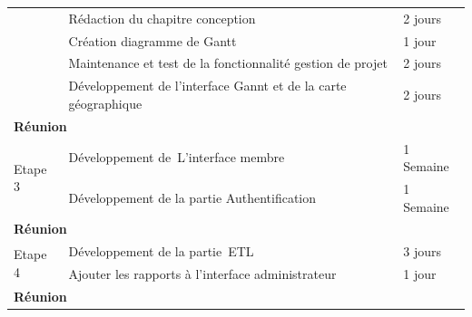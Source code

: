 \begin{table}
\begin{tabular}{|l|l|l|}
\cline{2-3}
                                & Rédaction du chapitre conception                                                                                                               & 2 jours               \\
\cline{2-3}
                                & Création diagramme de Gantt                                                                                                                    & 1 jour                \\
\cline{2-3}
                                & Maintenance et test de la fonctionnalité gestion de projet                                                                                     & 2 jours               \\
\cline{2-3}
                                & Développement de l’interface Gannt et de la carte géographique                                                                                 & 2 jours               \\
\hline
\multicolumn{3}{|l|}{\textbf{Réunion}}                                                                                                                                                                            \\
\hline
\multirow{2}{*}{Etape 3}        & Développement de~L’interface membre                                                                                                            & 1 Semaine             \\
\cline{2-3}
                                & Développement de la partie Authentification                                                                                                    & 1 Semaine             \\
\hline
\multicolumn{3}{|l|}{\textbf{Réunion}}                                                                                                                                                                             \\
\hline
\multirow{2}{*}{Etape 4}        & Développement de la partie~ETL                                                                                                                 & 3 jours               \\
\cline{2-3}
                                & Ajouter les rapports à l’interface administrateur                                                                                              & 1 jour                \\
\hline
\multicolumn{3}{|l|}{\textbf{Réunion}}                                                                                                                                                                             \\

\end{tabular}
\end{table}
